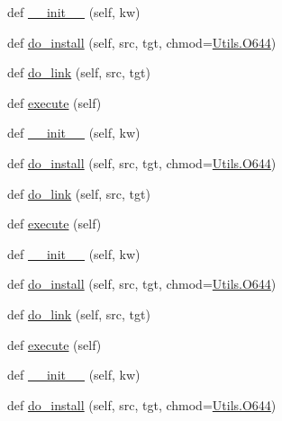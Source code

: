 \begin{DoxyCompactItemize}
\item 
def \hyperlink{classwaflib_1_1_build_1_1_uninstall_context_a4f1168ab484b0e1d748fefb5a6812b85}{\+\_\+\+\_\+init\+\_\+\+\_\+} (self, kw)
\item 
def \hyperlink{classwaflib_1_1_build_1_1_uninstall_context_a4b583a30eee0f110ab2b9b833aa00dd0}{do\+\_\+install} (self, src, tgt, chmod=\hyperlink{namespacewaflib_1_1_utils_ade9dd27fadbf52a0641bbff06d3dd3ac}{Utils.\+O644})
\item 
def \hyperlink{classwaflib_1_1_build_1_1_uninstall_context_a46252a8c474b628ac19e035c124f9e6b}{do\+\_\+link} (self, src, tgt)
\item 
def \hyperlink{classwaflib_1_1_build_1_1_uninstall_context_aadc84a51026ff5d9971566f29a0faaa8}{execute} (self)
\item 
def \hyperlink{classwaflib_1_1_build_1_1_uninstall_context_a4f1168ab484b0e1d748fefb5a6812b85}{\+\_\+\+\_\+init\+\_\+\+\_\+} (self, kw)
\item 
def \hyperlink{classwaflib_1_1_build_1_1_uninstall_context_a4b583a30eee0f110ab2b9b833aa00dd0}{do\+\_\+install} (self, src, tgt, chmod=\hyperlink{namespacewaflib_1_1_utils_ade9dd27fadbf52a0641bbff06d3dd3ac}{Utils.\+O644})
\item 
def \hyperlink{classwaflib_1_1_build_1_1_uninstall_context_a46252a8c474b628ac19e035c124f9e6b}{do\+\_\+link} (self, src, tgt)
\item 
def \hyperlink{classwaflib_1_1_build_1_1_uninstall_context_aadc84a51026ff5d9971566f29a0faaa8}{execute} (self)
\item 
def \hyperlink{classwaflib_1_1_build_1_1_uninstall_context_a4f1168ab484b0e1d748fefb5a6812b85}{\+\_\+\+\_\+init\+\_\+\+\_\+} (self, kw)
\item 
def \hyperlink{classwaflib_1_1_build_1_1_uninstall_context_a4b583a30eee0f110ab2b9b833aa00dd0}{do\+\_\+install} (self, src, tgt, chmod=\hyperlink{namespacewaflib_1_1_utils_ade9dd27fadbf52a0641bbff06d3dd3ac}{Utils.\+O644})
\item 
def \hyperlink{classwaflib_1_1_build_1_1_uninstall_context_a46252a8c474b628ac19e035c124f9e6b}{do\+\_\+link} (self, src, tgt)
\item 
def \hyperlink{classwaflib_1_1_build_1_1_uninstall_context_aadc84a51026ff5d9971566f29a0faaa8}{execute} (self)
\item 
def \hyperlink{classwaflib_1_1_build_1_1_uninstall_context_a4f1168ab484b0e1d748fefb5a6812b85}{\+\_\+\+\_\+init\+\_\+\+\_\+} (self, kw)
\item 
def \hyperlink{classwaflib_1_1_build_1_1_uninstall_context_a4b583a30eee0f110ab2b9b833aa00dd0}{do\+\_\+install} (self, src, tgt, chmod=\hyperlink{namespacewaflib_1_1_utils_ade9dd27fadbf52a0641bbff06d3dd3ac}{Utils.\+O644})

\end{DoxyCompactItemize}
